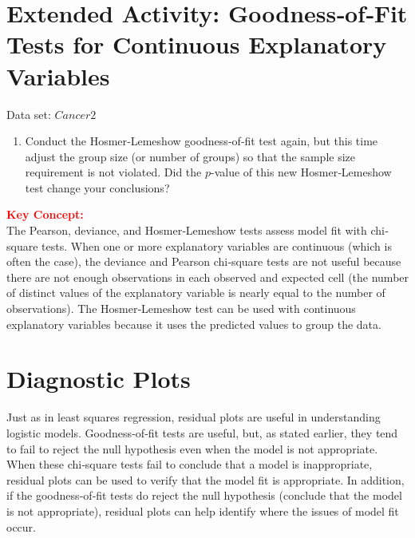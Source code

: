\documentclass[
]{report}
\providecommand{\tightlist}{%
  \setlength{\itemsep}{0pt}\setlength{\parskip}{0pt}}
\begin{document}
\section*{Extended Activity: Goodness‐of‐Fit Tests for Continuous Explanatory Variables}\label{extended-activity-goodnessoffit-tests-for-continuous-explanatory-variables-1}

Data set: \(Cancer2\)

\begin{enumerate}
\def\labelenumi{\arabic{enumi}.}
\setcounter{enumi}{31}
\tightlist
\item
  Conduct the Hosmer‐Lemeshow goodness‐of‐fit test again, but this time adjust the group size (or number of groups) so that the sample size requirement is not violated. Did the \(p\)-value of this new Hosmer‐Lemeshow test change your conclusions?
\end{enumerate}

\large

\textbf{\textcolor{red}{Key Concept:}}\\
\color{red}
The Pearson, deviance, and Hosmer‐Lemeshow tests assess model fit with chi‐square tests. When one or more explanatory variables are continuous (which is often the case), the deviance and Pearson chi‐square tests are not useful because there are not enough observations in each observed and expected cell (the number of distinct values of the explanatory variable is nearly equal to the number of observations). The Hosmer‐Lemeshow test can be used with continuous explanatory variables because it uses the predicted values to group the data.
\color{black}
\normalsize

\section{\texorpdfstring{\textbf{Diagnostic Plots}}{Diagnostic Plots}}\label{diagnostic-plots}

Just as in least squares regression, residual plots are useful in understanding logistic models. Goodness‐of‐fit tests are useful, but, as stated earlier, they tend to fail to reject the null hypothesis even when the model is not appropriate. When these chi‐square tests fail to conclude that a model is inappropriate, residual plots can be used to verify that the model fit is appropriate. In addition, if the goodness‐of‐fit tests do reject the null hypothesis (conclude that the model is not appropriate), residual plots can help identify where the issues of model fit occur.
\end{document}
